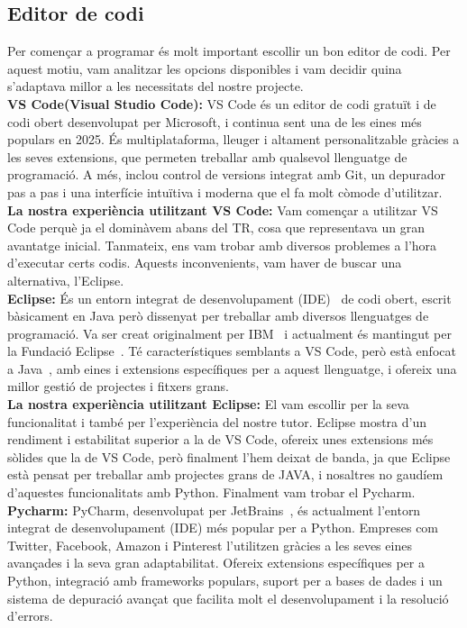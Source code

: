 \subsection{Editor de codi}
Per començar a programar és molt important escollir un bon editor de codi. Per aquest motiu, vam analitzar les opcions disponibles i vam decidir quina s’adaptava millor a les necessitats del nostre projecte.\\

\textbf{VS Code(Visual Studio Code): }
VS Code és un editor de codi gratuït i de codi obert desenvolupat per Microsoft, i continua sent una de les eines més populars en 2025. És multiplataforma, lleuger i altament personalitzable gràcies a les seves extensions, que permeten treballar amb qualsevol llenguatge de programació. A més, inclou control de versions integrat amb Git, un depurador pas a pas i una interfície intuïtiva i moderna que el fa molt còmode d’utilitzar.\\

\textbf{La nostra experiència utilitzant VS Code:}
Vam començar a utilitzar VS Code perquè ja el dominàvem abans del TR, cosa que representava un gran avantatge inicial. Tanmateix, ens vam trobar amb diversos problemes a l'hora d'executar certs codis. Aquests inconvenients, vam haver de buscar una alternativa, l'Eclipse.\\

\textbf{Eclipse: }
És un entorn integrat de desenvolupament (IDE)~\cite{IDE} de codi obert, escrit bàsicament en Java però dissenyat per treballar amb diversos llenguatges de programació. Va ser creat originalment per IBM~\cite{IBM_} i actualment és mantingut per la Fundació Eclipse~\cite{Fundation}. Té característiques semblants a VS Code, però està enfocat a Java~\cite{JAVA}, amb eines i extensions específiques per a aquest llenguatge, i ofereix una millor gestió de projectes i fitxers grans.\\

\textbf{La nostra experiència utilitzant Eclipse:}
El vam escollir per la seva funcionalitat i també per l'experiència del nostre tutor. Eclipse mostra d'un rendiment i estabilitat superior a la de VS Code, ofereix unes extensions més sòlides que la de VS Code, però finalment l'hem deixat de banda, ja que Eclipse està pensat per treballar amb projectes grans de JAVA, i nosaltres no gaudíem d'aquestes funcionalitats amb Python. Finalment vam trobar el Pycharm.\\

\textbf{Pycharm: }
PyCharm, desenvolupat per JetBrains~\cite{Jet}, és actualment l’entorn integrat de desenvolupament (IDE) més popular per a Python. Empreses com Twitter, Facebook, Amazon i Pinterest l’utilitzen gràcies a les seves eines avançades i la seva gran adaptabilitat. Ofereix extensions específiques per a Python, integració amb frameworks populars, suport per a bases de dades i un sistema de depuració avançat que facilita molt el desenvolupament i la resolució d’errors.\\


